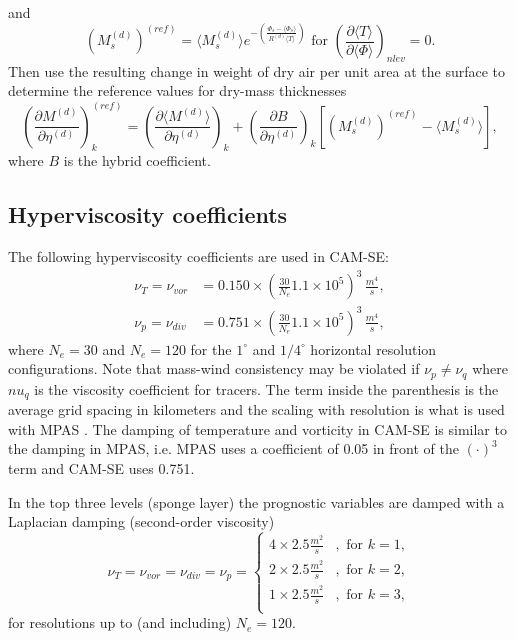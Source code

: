 \documentclass{agujournal}
\begin{document}
and
\begin{equation}
\left( M^{(d)}_s \right)^{(ref)}=\langle M^{(d)}_s \rangle e^{-\left( \frac{\Phi_s-\langle \Phi_s\rangle}{R^{(d)}\langle T \rangle}\right)}\text{ for }\left( \frac{\partial \langle T\rangle}{\partial \langle \Phi \rangle}\right)_{nlev}= 0.
\end{equation}
Then use the resulting change in weight of dry air per unit area at the surface to determine the reference values for dry-mass thicknesses
\begin{equation}
\left( \frac{\partial M^{(d)}}{\partial \eta^{(d)}}\right)^{(ref)}_k=\left( \frac{\partial \langle M^{(d)}\rangle}{\partial \eta^{(d)}}\right)_k+\left( \frac{\partial B}{\partial \eta^{(d)}}\right)_k\left[ \left( M^{(d)}_s \right)^{(ref)}-\langle M^{(d)}_s \rangle \right],
\end{equation}
where $B$ is the hybrid coefficient.
%
%
% 
\subsection{Hyperviscosity coefficients}\label{app:nu}
The following hyperviscosity coefficients are used in CAM-SE:
\begin{align}
\nu_T = \nu_{vor} &= 0.150\times \left(\frac{30}{N_e}1.1\times 10^5\right)^3\, \frac{m^4}{s},\\
\nu_p = \nu_{div} &= 0.751\times \left(\frac{30}{N_e}1.1\times 10^5\right)^3\, \frac{m^4}{s},
\end{align}
where $N_e=30$ and $N_e=120$ for the $1^\circ$ and $1/4^{\circ}$ horizontal resolution configurations. Note that mass-wind consistency may be violated if $\nu_p \neq \nu_q$ where $nu_q$ is the viscosity coefficient for tracers. The term inside the parenthesis is the average grid spacing in kilometers and the scaling with resolution is what is used with MPAS \citep[Model for Prediction Across Scales; ][]{SPKS2014JAS}. The damping of temperature and vorticity in CAM-SE is similar to the damping in MPAS, i.e. MPAS uses a coefficient of 0.05 in front of the $(\cdot)^3$ term and CAM-SE uses 0.751.

In the top three levels (sponge layer) the prognostic variables are damped with a Laplacian damping (second-order viscosity)
\begin{equation}
\nu_T = \nu_{vor} = \nu_{div} = \nu_p = 
\begin{cases}
4\times 2.5 \frac{m^2}{s}&, \text{ for }k=1,\\
2\times 2.5 \frac{m^2}{s}&, \text{ for }k=2,\\
1\times 2.5 \frac{m^2}{s}&, \text{ for }k=3,\\
\end{cases}
\end{equation}
for resolutions up to (and including) $N_e=120$.
%
\end{document}
